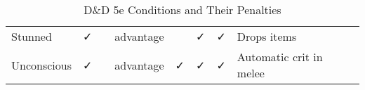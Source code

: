 \documentclass[letterpaper,landscape,12pt]{article}
\begin{document}
\begin{table}[h!]
\begin{tabular}{@{}l c c c c c c l@{}}
Stunned            & ✓                                            &                                                & \parbox{2.5cm}{\centering advantage}           &                                     & ✓                                      & ✓                                   & Drops items \\ 
Unconscious        & ✓                                            &                                                & \parbox{2.5cm}{\centering advantage}           & ✓                                   & ✓                                      & ✓                                   & Automatic crit in melee \\ \bottomrule
\end{tabular}
\caption{D\&D 5e Conditions and Their Penalties}
\label{tab:conditions}
\end{table}
\end{document}
